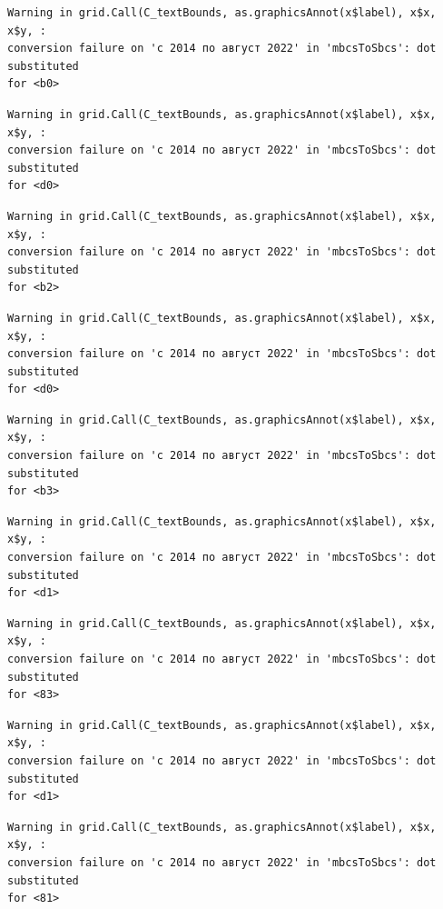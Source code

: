 \documentclass[
  letterpaper,
  DIV=11,
  numbers=noendperiod]{scrartcl}
\begin{document}
\begin{verbatim}
Warning in grid.Call(C_textBounds, as.graphicsAnnot(x$label), x$x, x$y, :
conversion failure on 'с 2014 по август 2022' in 'mbcsToSbcs': dot substituted
for <b0>
\end{verbatim}

\begin{verbatim}
Warning in grid.Call(C_textBounds, as.graphicsAnnot(x$label), x$x, x$y, :
conversion failure on 'с 2014 по август 2022' in 'mbcsToSbcs': dot substituted
for <d0>
\end{verbatim}

\begin{verbatim}
Warning in grid.Call(C_textBounds, as.graphicsAnnot(x$label), x$x, x$y, :
conversion failure on 'с 2014 по август 2022' in 'mbcsToSbcs': dot substituted
for <b2>
\end{verbatim}

\begin{verbatim}
Warning in grid.Call(C_textBounds, as.graphicsAnnot(x$label), x$x, x$y, :
conversion failure on 'с 2014 по август 2022' in 'mbcsToSbcs': dot substituted
for <d0>
\end{verbatim}

\begin{verbatim}
Warning in grid.Call(C_textBounds, as.graphicsAnnot(x$label), x$x, x$y, :
conversion failure on 'с 2014 по август 2022' in 'mbcsToSbcs': dot substituted
for <b3>
\end{verbatim}

\begin{verbatim}
Warning in grid.Call(C_textBounds, as.graphicsAnnot(x$label), x$x, x$y, :
conversion failure on 'с 2014 по август 2022' in 'mbcsToSbcs': dot substituted
for <d1>
\end{verbatim}

\begin{verbatim}
Warning in grid.Call(C_textBounds, as.graphicsAnnot(x$label), x$x, x$y, :
conversion failure on 'с 2014 по август 2022' in 'mbcsToSbcs': dot substituted
for <83>
\end{verbatim}

\begin{verbatim}
Warning in grid.Call(C_textBounds, as.graphicsAnnot(x$label), x$x, x$y, :
conversion failure on 'с 2014 по август 2022' in 'mbcsToSbcs': dot substituted
for <d1>
\end{verbatim}

\begin{verbatim}
Warning in grid.Call(C_textBounds, as.graphicsAnnot(x$label), x$x, x$y, :
conversion failure on 'с 2014 по август 2022' in 'mbcsToSbcs': dot substituted
for <81>
\end{verbatim}
\end{document}

